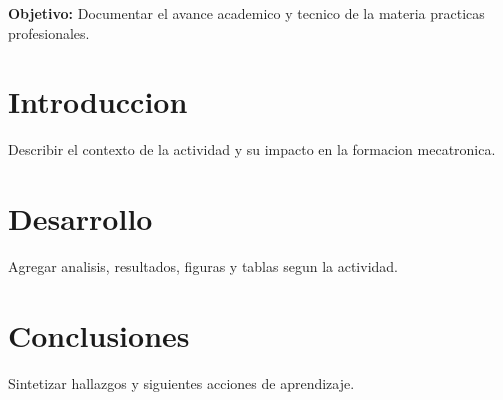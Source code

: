 \documentclass[spanish,letterpaper,oneside]{article}
\begin{document}
\templatePortrait
\templatePagecfg
\onehalfspacing

\begin{abstractd}
\textbf{Objetivo:} Documentar el avance academico y tecnico de la materia practicas profesionales.
\end{abstractd}

\templateIndex
\templateFinalcfg

\section{Introduccion}
Describir el contexto de la actividad y su impacto en la formacion mecatronica.

\section{Desarrollo}
Agregar analisis, resultados, figuras y tablas segun la actividad.

\section{Conclusiones}
Sintetizar hallazgos y siguientes acciones de aprendizaje.



\end{document}
